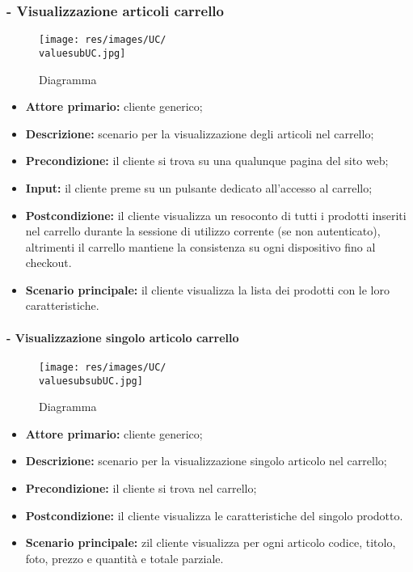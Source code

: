 \subsubsection{ - Visualizzazione articoli carrello}
\begin{figure}[H]
    \centering
    \texttt{[image: res/images/UC/\\valuesubUC.jpg]}
    \caption{Diagramma }
\end{figure}
\begin{itemize}
    \item \textbf{Attore primario:} cliente generico;
    \item \textbf{Descrizione:} scenario per la visualizzazione degli articoli nel carrello;
    \item \textbf{Precondizione:} il cliente si trova su una qualunque pagina del sito web;
    \item \textbf{Input:} il cliente preme su un pulsante dedicato all'accesso al carrello;
    \item \textbf{Postcondizione:} il cliente visualizza un resoconto di tutti i prodotti inseriti nel carrello durante la sessione di utilizzo corrente (se non autenticato), altrimenti il carrello mantiene la consistenza su ogni dispositivo fino al checkout.
    \item \textbf{Scenario principale:} il cliente visualizza la lista dei prodotti con le loro caratteristiche.
\end{itemize}

\stepsubsubUserCase
\paragraph{ - Visualizzazione singolo articolo carrello}
\begin{figure}[H]
    \centering
    \texttt{[image: res/images/UC/\\valuesubsubUC.jpg]}
    \caption{Diagramma }
\end{figure}
\begin{itemize}
    \item \textbf{Attore primario:} cliente generico;
    \item \textbf{Descrizione:} scenario per la visualizzazione singolo articolo nel carrello;
    \item \textbf{Precondizione:} il cliente si trova nel carrello;
    \item \textbf{Postcondizione:} il cliente visualizza le caratteristiche del singolo prodotto.
    \item \textbf{Scenario principale:} zil cliente visualizza per ogni articolo codice, titolo, foto, prezzo e quantità e totale parziale.
\end{itemize}


